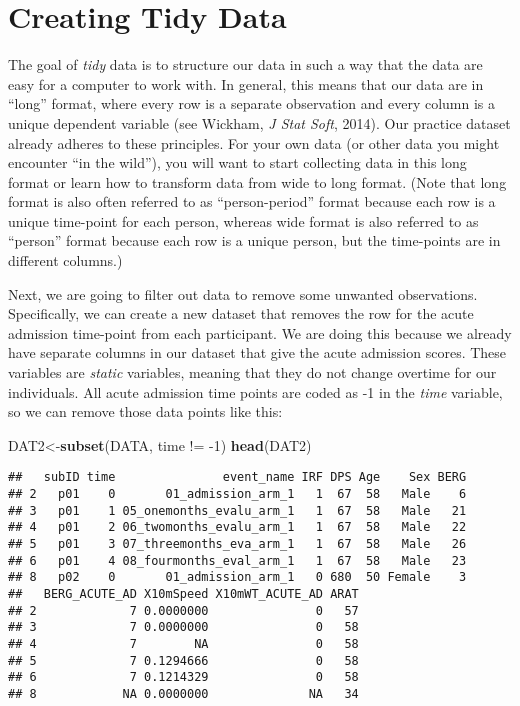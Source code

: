 \documentclass[]{article}
\newenvironment{Shaded}{\begin{snugshade}}{\end{snugshade}}
\newcommand{\KeywordTok}[1]{\textcolor[rgb]{0.13,0.29,0.53}{\textbf{{#1}}}}
\newcommand{\DecValTok}[1]{\textcolor[rgb]{0.00,0.00,0.81}{{#1}}}
\newcommand{\StringTok}[1]{\textcolor[rgb]{0.31,0.60,0.02}{{#1}}}
\newcommand{\NormalTok}[1]{{#1}}
\begin{document}
\newpage

\section{Creating Tidy Data}\label{creating-tidy-data}

The goal of \emph{tidy} data is to structure our data in such a way that
the data are easy for a computer to work with. In general, this means
that our data are in ``long'' format, where every row is a separate
observation and every column is a unique dependent variable (see
Wickham, \emph{J Stat Soft}, 2014). Our practice dataset already adheres
to these principles. For your own data (or other data you might
encounter ``in the wild''), you will want to start collecting data in
this long format or learn how to transform data from wide to long
format. (Note that long format is also often referred to as
``person-period'' format because each row is a unique time-point for
each person, whereas wide format is also referred to as ``person''
format because each row is a unique person, but the time-points are in
different columns.)

Next, we are going to filter out data to remove some unwanted
observations. Specifically, we can create a new dataset that removes the
row for the acute admission time-point from each participant. We are
doing this because we already have separate columns in our dataset that
give the acute admission scores. These variables are \emph{static}
variables, meaning that they do not change overtime for our individuals.
All acute admission time points are coded as -1 in the \emph{time}
variable, so we can remove those data points like this:

\begin{Shaded}
\begin{Highlighting}[]
\NormalTok{DAT2<-}\KeywordTok{subset}\NormalTok{(DATA, time !=}\StringTok{ }\NormalTok{-}\DecValTok{1}\NormalTok{)}
\KeywordTok{head}\NormalTok{(DAT2)}
\end{Highlighting}
\end{Shaded}

\begin{verbatim}
##   subID time               event_name IRF DPS Age    Sex BERG
## 2   p01    0       01_admission_arm_1   1  67  58   Male    6
## 3   p01    1 05_onemonths_evalu_arm_1   1  67  58   Male   21
## 4   p01    2 06_twomonths_evalu_arm_1   1  67  58   Male   22
## 5   p01    3 07_threemonths_eva_arm_1   1  67  58   Male   26
## 6   p01    4 08_fourmonths_eval_arm_1   1  67  58   Male   23
## 8   p02    0       01_admission_arm_1   0 680  50 Female    3
##   BERG_ACUTE_AD X10mSpeed X10mWT_ACUTE_AD ARAT
## 2             7 0.0000000               0   57
## 3             7 0.0000000               0   58
## 4             7        NA               0   58
## 5             7 0.1294666               0   58
## 6             7 0.1214329               0   58
## 8            NA 0.0000000              NA   34
\end{verbatim}
\end{document}
